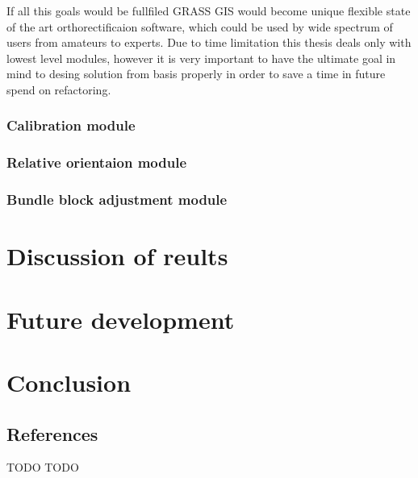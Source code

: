 \documentclass[a4paper,12pt]{report}
\begin{document}
If all this goals would be fullfiled GRASS GIS would become unique flexible state of the art orthorectificaion 
software, which could be used by wide spectrum of users from amateurs to experts.
Due to time limitation this thesis deals only with lowest level modules, however it is very important to have 
the ultimate goal in mind to desing solution from basis properly in order to save a time in future spend 
on refactoring.

\subsection{Calibration module}

\subsection{Relative orientaion module}

\subsection{Bundle block adjustment module}


\chapter{Discussion of reults}

\chapter{Future development}

\chapter{Conclusion}

\section{References}









TODO
TODO



\end{document}
